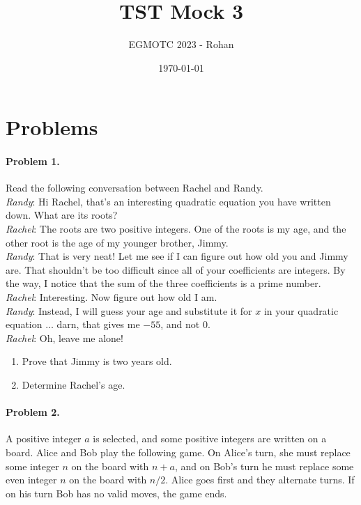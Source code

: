 \documentclass[12pt]{article}
\title{TST Mock 3}
\author{EGMOTC 2023 - Rohan}
\date{\today}
\begin{document}
\maketitle

\newcommand{\localtextbulletone}{\textcolor{black}{\raisebox{.45ex}{\rule{.6ex}{.6ex}}}}
\renewcommand{\labelitemi}{\localtextbulletone}

\section*{Problems}
\vspace{0cm}
\thispagestyle{empty}

\paragraph{\textbf{Problem 1.}} Read the following conversation between Rachel and Randy.\\ %

\textit{Randy}: Hi Rachel, that's an interesting quadratic equation you have written down. What are its roots?\\
\textit{Rachel}: The roots are two positive integers. One of the roots is my age, and the other root is the age of my younger brother, Jimmy.\\
\textit{Randy}: That is very neat! Let me see if I can figure out how old you and Jimmy are. That shouldn't be too difficult since all of your coefficients are integers. By the way, I notice that the sum of the three coefficients is a prime number.\\
\textit{Rachel}: Interesting. Now figure out how old I am.\\
\textit{Randy}: Instead, I will guess your age and substitute it for $x$ in your quadratic equation $\dots$ darn, that gives me $-55$, and not $0$.\\
\textit{Rachel}: Oh, leave me alone!

\begin{enumerate}
    \item Prove that Jimmy is two years old.
    \item Determine Rachel's age.
\end{enumerate}

\paragraph{\textbf{Problem 2.}} A positive integer $a$ is selected, and some positive integers are written on a board. Alice and Bob play the following game. On Alice's turn, she must replace some integer $n$ on the board with $n+a$, and on Bob's turn he must replace some even integer $n$ on the board with $n/2$. Alice goes first and they alternate turns. If on his turn Bob has no valid moves, the game ends.\\
\end{document}
